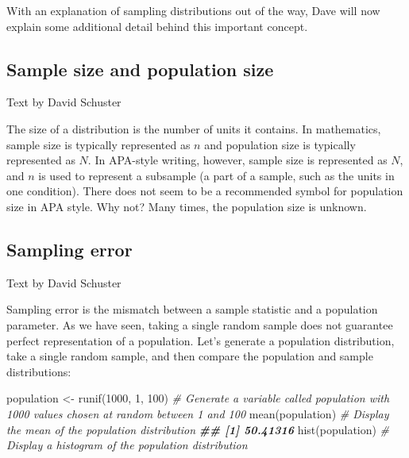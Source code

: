 \documentclass[
]{book}
\newenvironment{Shaded}{\begin{snugshade}}{\end{snugshade}}
\newcommand{\CommentTok}[1]{\textcolor[rgb]{0.56,0.35,0.01}{\textit{#1}}}
\newcommand{\DecValTok}[1]{\textcolor[rgb]{0.00,0.00,0.81}{#1}}
\newcommand{\DocumentationTok}[1]{\textcolor[rgb]{0.56,0.35,0.01}{\textbf{\textit{#1}}}}
\newcommand{\FunctionTok}[1]{\textcolor[rgb]{0.00,0.00,0.00}{#1}}
\newcommand{\NormalTok}[1]{#1}
\newcommand{\OtherTok}[1]{\textcolor[rgb]{0.56,0.35,0.01}{#1}}
\begin{document}
With an explanation of sampling distributions out of the way, Dave will now explain some additional detail behind this important concept.

\hypertarget{sample-size-and-population-size}{%
\subsection{Sample size and population size}\label{sample-size-and-population-size}}

Text by David Schuster

The size of a distribution is the number of units it contains. In mathematics, sample size is typically represented as \(n\) and population size is typically represented as \(N\). In APA-style writing, however, sample size is represented as \(N\), and \(n\) is used to represent a subsample (a part of a sample, such as the units in one condition). There does not seem to be a recommended symbol for population size in APA style. Why not? Many times, the population size is unknown.

\hypertarget{sampling-error}{%
\subsection{Sampling error}\label{sampling-error}}

Text by David Schuster

Sampling error is the mismatch between a sample statistic and a population parameter. As we have seen, taking a single random sample does not guarantee perfect representation of a population. Let's generate a population distribution, take a single random sample, and then compare the population and sample distributions:

\begin{Shaded}
\begin{Highlighting}[]
\NormalTok{population }\OtherTok{\textless{}{-}} \FunctionTok{runif}\NormalTok{(}\DecValTok{1000}\NormalTok{, }\DecValTok{1}\NormalTok{, }\DecValTok{100}\NormalTok{) }\CommentTok{\# Generate a variable called \textquotesingle{}population\textquotesingle{} with 1000 values chosen at random between 1 and 100}
\FunctionTok{mean}\NormalTok{(population) }\CommentTok{\# Display the mean of the population distribution}
\DocumentationTok{\#\# [1] 50.41316}
\FunctionTok{hist}\NormalTok{(population) }\CommentTok{\# Display a histogram of the population distribution}
\end{Highlighting}
\end{Shaded}
\end{document}

